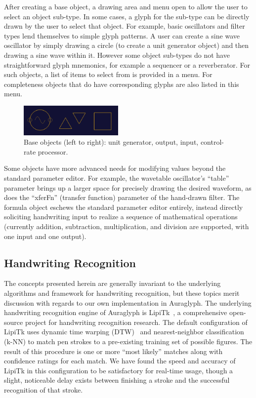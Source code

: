 \documentclass{nime-alternate}
\begin{document}
After creating a base object, a drawing area and menu open to allow the user to select an object sub-type. 
In some cases, a glyph for the sub-type can be directly drawn by the user to select that object. 
For example, basic oscillators and filter types lend themselves to simple glyph patterns. 
A user can create a sine wave oscillator by simply drawing a circle (to create a unit generator object) and then drawing a sine wave within it. 
However some object sub-types do not have straightforward glyph mnemonics, for example a sequencer or a reverberator. 
For such objects, a list of items to select from is provided in a menu. 
For completeness objects that do have corresponding glyphs are also listed in this menu. 

\begin{figure}[h]
	\centering
		\includegraphics[width=0.45\textwidth]{figures/baseobjects.png}
	\caption{Base objects (left to right): unit generator, output, input, control-rate processor.}
	\label{fig:baseObjects}
\end{figure}

Some objects have more advanced needs for modifying values beyond the standard parameter editor.  
For example, the wavetable oscillator's ``table'' parameter brings up a larger space for precisely drawing the desired waveform, as does the ``xferFn'' (transfer function) parameter of the hand-drawn filter. 
The formula object eschews the standard parameter editor entirely, instead directly soliciting handwriting input to realize a sequence of mathematical operations (currently addition, subtraction, multiplication, and division are supported, with one input and one output). 

\subsection{Handwriting Recognition}
\label{sec:HandwritingRecognition}

The concepts presented herein are generally invariant to the underlying algorithms and framework for handwriting recognition, but these topics merit discussion with regards to our own implementation in Auraglyph. 
The underlying handwriting recognition engine of Auraglyph is LipiTk~\cite{madhvanath2007lipitk}, a comprehensive open-source project for handwriting recognition research. 
The default configuration of LipiTk uses dynamic time warping (DTW)~\cite{niels2005using} and nearest-neighbor classification (k-NN) to match pen strokes to a pre-existing training set of possible figures. 
The result of this procedure is one or more ``most likely'' matches along with confidence ratings for each match. 
We have found the speed and accuracy of LipiTk in this configuration to be satisfactory for real-time usage, though a slight, noticeable delay exists between finishing a stroke and the successful recognition of that stroke. 
\end{document}
